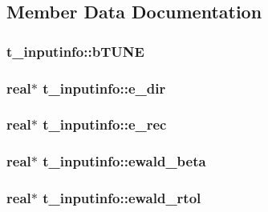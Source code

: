\subsection{\-Member \-Data \-Documentation}
\hypertarget{structt__inputinfo_a80ac246cb3ca8122b0c34f0956a96e8b}{
\subsubsection[{b\-T\-U\-N\-E}]{ {\bf t\-\_\-inputinfo\-::b\-T\-U\-N\-E}}}\label{structt__inputinfo_a80ac246cb3ca8122b0c34f0956a96e8b}
\hypertarget{structt__inputinfo_a21ae6c6db9063c71dbcff4479bba0cd3}{
\subsubsection[{e\-\_\-dir}]{\setlength{\rightskip}{0pt plus 5cm}real$\ast$ {\bf t\-\_\-inputinfo\-::e\-\_\-dir}}}\label{structt__inputinfo_a21ae6c6db9063c71dbcff4479bba0cd3}
\hypertarget{structt__inputinfo_a96c3b2b6ab3b4564ab8877625b1f50cf}{
\subsubsection[{e\-\_\-rec}]{\setlength{\rightskip}{0pt plus 5cm}real$\ast$ {\bf t\-\_\-inputinfo\-::e\-\_\-rec}}}\label{structt__inputinfo_a96c3b2b6ab3b4564ab8877625b1f50cf}
\hypertarget{structt__inputinfo_a82eb145f8e09fe106574513582b0f2cc}{
\subsubsection[{ewald\-\_\-beta}]{\setlength{\rightskip}{0pt plus 5cm}real$\ast$ {\bf t\-\_\-inputinfo\-::ewald\-\_\-beta}}}\label{structt__inputinfo_a82eb145f8e09fe106574513582b0f2cc}
\hypertarget{structt__inputinfo_a8839f11c0ab53b4f826d6821c4f839bb}{
\subsubsection[{ewald\-\_\-rtol}]{\setlength{\rightskip}{0pt plus 5cm}real$\ast$ {\bf t\-\_\-inputinfo\-::ewald\-\_\-rtol}}}\label{structt__inputinfo_a8839f11c0ab53b4f826d6821c4f839bb}
